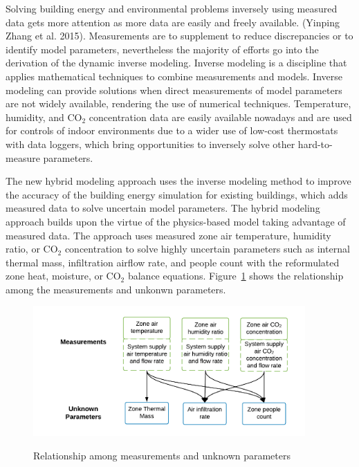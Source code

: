 \documentclass[11pt]{article}
\begin{document}
Solving building energy and environmental problems inversely using measured data gets more attention as more data are easily and freely available. (Yinping Zhang et al. 2015). Measurements are to supplement to reduce discrepancies or to identify model parameters, nevertheless the majority of efforts go into the derivation of the dynamic inverse modeling. Inverse modeling is a discipline that applies mathematical techniques to combine measurements and models. Inverse modeling can provide solutions when direct measurements of model parameters are not widely available, rendering the use of numerical techniques. Temperature, humidity, and CO$_2$ concentration data are easily available nowadays and are used for controls of indoor environments due to a wider use of low-cost thermostats with data loggers, which bring opportunities to inversely solve other hard-to-measure parameters.

The new hybrid modeling approach uses the inverse modeling method to improve the accuracy of the building energy simulation for existing buildings, which adds measured data to solve uncertain model parameters. The hybrid modeling approach builds upon the virtue of the physics-based model taking advantage of measured data. The approach uses measured zone air temperature, humidity ratio, or CO$_2$ concentration to solve highly uncertain parameters such as internal thermal mass, infiltration airflow rate, and people count with the reformulated zone heat, moisture, or CO$_2$ balance equations. Figure~\ref{fig:hybrid-model-solution-diagram} shows the relationship among the measurements and unkonwn parameters. 

\begin{figure}[h]
\begin{center}
\includegraphics[width=295pt]{media/img_HybridModel-0.png}
\caption{Relationship among measurements and unknown parameters}\protect \label{fig:hybrid-model-solution-diagram}
\end{center}
\end{figure}
\end{document}
